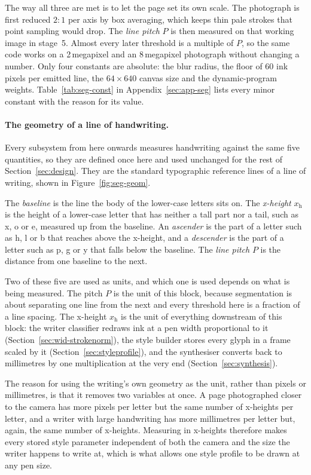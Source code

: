 The way all three are met is to let the page set its own scale. The photograph is first reduced $2{:}1$ per axis by box averaging, which keeps thin pale strokes that point sampling would drop. The \emph{line pitch} $P$ is then measured on that working image in stage~5. Almost every later threshold is a multiple of $P$, so the same code works on a 2\,megapixel and an 8\,megapixel photograph without changing a number. Only four constants are absolute: the blur radius, the floor of 60 ink pixels per emitted line, the $64\times640$ canvas size and the dynamic-program weights. Table~\ref{tab:seg-const} in Appendix~\ref{sec:app-seg} lists every minor constant with the reason for its value.

\paragraph{The geometry of a line of handwriting.}
\label{sec:seg-geom}
Every subsystem from here onwards measures handwriting against the same five quantities, so they are defined once here and used unchanged for the rest of Section~\ref{sec:design}. They are the standard typographic reference lines of a line of writing, shown in Figure~\ref{fig:seg-geom}.

The \emph{baseline} is the line the body of the lower-case letters sits on. The \emph{x-height} $x_{\mathrm{h}}$ is the height of a lower-case letter that has neither a tall part nor a tail, such as x, o or e, measured up from the baseline. An \emph{ascender} is the part of a letter such as h, l or b that reaches above the x-height, and a \emph{descender} is the part of a letter such as p, g or y that falls below the baseline. The \emph{line pitch} $P$ is the distance from one baseline to the next.

Two of these five are used as units, and which one is used depends on what is being measured. The pitch $P$ is the unit of this block, because segmentation is about separating one line from the next and every threshold here is a fraction of a line spacing. The x-height $x_{\mathrm{h}}$ is the unit of everything downstream of this block: the writer classifier redraws ink at a pen width proportional to it (Section~\ref{sec:wid-strokenorm}), the style builder stores every glyph in a frame scaled by it (Section~\ref{sec:styleprofile}), and the synthesiser converts back to millimetres by one multiplication at the very end (Section~\ref{sec:synthesis}).

The reason for using the writing's own geometry as the unit, rather than pixels or millimetres, is that it removes two variables at once. A page photographed closer to the camera has more pixels per letter but the same number of x-heights per letter, and a writer with large handwriting has more millimetres per letter but, again, the same number of x-heights. Measuring in x-heights therefore makes every stored style parameter independent of both the camera and the size the writer happens to write at, which is what allows one style profile to be drawn at any pen size.

